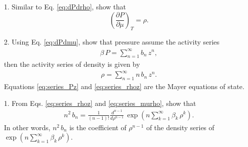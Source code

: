 \documentclass{book}
\begin{document}



1. Similar to Eq. \eqref{eq:dPdrho}, show that
\begin{equation}
  \left(
    \frac{ \partial P } { \partial \mu }
  \right)_T
=
  \rho.
  \label{eq:dPdmu}
\end{equation}


2. Using Eq. \eqref{eq:dPdmu}, show that pressure assume the activity series
\begin{align}
  \beta \, P = \sum_{n = 1}^\infty b_n \, z^n,
  \label{eq:series_Pz}
\end{align}
then the activity series of density is given by
\begin{align}
  \rho = \sum_{n = 1}^\infty n \, b_n \, z^n.
  \label{eq:series_rhoz}
\end{align}
Equations \eqref{eq:series_Pz} and \eqref{eq:series_rhoz}
are the Mayer equations of state.







1. From Eqs. \eqref{eq:series_rhoz} and \eqref{eq:series_murho},
show that
\begin{align}
  n^2 \, b_n
=
  \frac{1} {(n - 1)!}
  \frac{ d^{n-1} } { d \rho^{n-1} }
  \,
  \exp
  \left(
  n \sum_{k = 1}^\infty \beta_k \, \rho^k
  \right).
\end{align}
In other words,
$n^2 \, b_n$
is the coefficient of $\rho^{n-1}$
of the density series of
$\exp \left( n \sum_{k = 1}^\infty \beta_k \, \rho^k \right)$.

\end{document}
